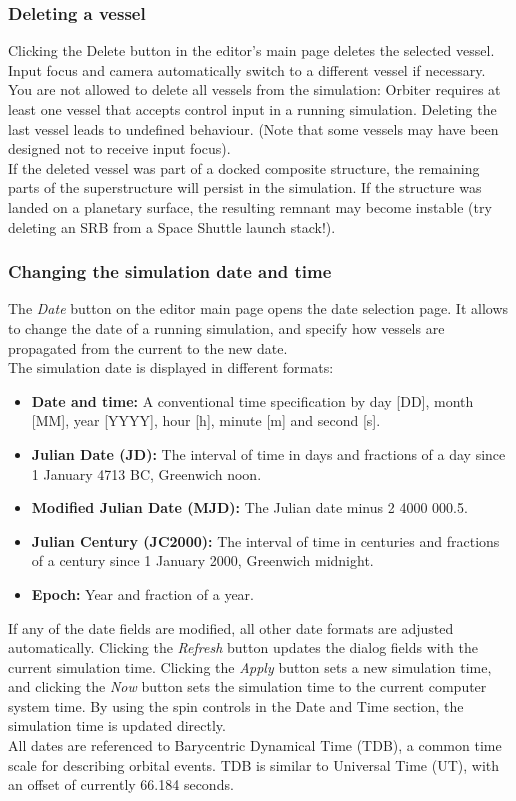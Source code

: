 \documentclass[Orbiter User Manual.tex]{subfiles}
\begin{document}
\subsubsection{Deleting a vessel}
Clicking the Delete button in the editor's main page deletes the selected vessel. Input focus and camera automatically switch to a different vessel if necessary.\\
You are not allowed to delete all vessels from the simulation: Orbiter requires at least one vessel that accepts control input in a running simulation. Deleting the last vessel leads to undefined behaviour. (Note that some vessels may have been designed not to receive input focus).\\
If the deleted vessel was part of a docked composite structure, the remaining parts of the superstructure will persist in the simulation. If the structure was landed on a planetary surface, the resulting remnant may become instable (try deleting an SRB from a Space Shuttle launch stack!).

\subsubsection{Changing the simulation date and time}
The \textit{Date} button on the editor main page opens the date selection page. It allows to change the date of a running simulation, and specify how vessels are propagated from the current to the new date.\\
The simulation date is displayed in different formats:

\begin{itemize}
\item \textbf{Date and time:} A conventional time specification by day [DD], month [MM], year [YYYY], hour [h], minute [m] and second [s].
\item \textbf{Julian Date (JD):} The interval of time in days and fractions of a day since 1 January 4713 BC, Greenwich noon.
\item \textbf{Modified Julian Date (MJD):} The Julian date minus 2 4000 000.5.
\item \textbf{Julian Century (JC2000):} The interval of time in centuries and fractions of a century since 1 January 2000, Greenwich midnight.
\item \textbf{Epoch:} Year and fraction of a year.
\end{itemize}

\noindent
If any of the date fields are modified, all other date formats are adjusted automatically. Clicking the \textit{Refresh} button updates the dialog fields with the current simulation time. Clicking the \textit{Apply} button sets a new simulation time, and clicking the \textit{Now} button sets the simulation time to the current computer system time. By using the spin controls in the Date and Time section, the simulation time is updated directly.\\
All dates are referenced to Barycentric Dynamical Time (TDB), a common time scale for describing orbital events. TDB is similar to Universal Time (UT), with an offset of currently 66.184 seconds.
\end{document}
